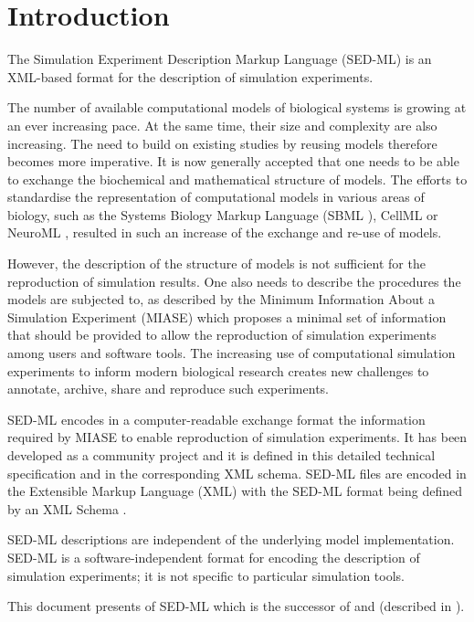 \chapter{Introduction}
The Simulation Experiment Description Markup Language (SED-ML) is an XML-based format for the description of simulation experiments.

The number of available computational models of biological systems is growing at an ever increasing pace. 
At the same time, their size and complexity are also increasing. The need to build on existing studies by reusing models therefore becomes more imperative. It is now generally accepted that one needs to be able to exchange the biochemical and mathematical structure of models. The efforts to standardise the representation of computational models in various areas of biology, such as the Systems Biology Markup Language (SBML \citep{Hucka:2003}), CellML \citep{cuellar:2003} or NeuroML \citep{Goddard:2001}, resulted in such an increase of the exchange and re-use of models. 

However, the description of the structure of models is not sufficient for the reproduction of simulation results. One also needs to describe the procedures the models are subjected to, as described by the Minimum Information About a Simulation Experiment (MIASE) \citep{Waltemath:2011} which proposes a minimal set of information that should be provided to allow the reproduction of simulation experiments among users and software tools. The increasing use of computational simulation experiments to inform modern biological research creates new challenges to annotate, archive, share and reproduce such experiments. 

SED-ML encodes in a computer-readable exchange format the information required by MIASE to enable reproduction of simulation experiments. It has been developed as a community project and it is defined in this detailed technical specification and in the corresponding XML schema. SED-ML files are encoded in the Extensible Markup Language (XML) \citep{Bray:2006} with the SED-ML format being defined by an XML Schema \citep{Fallside:2001}. 

SED-ML descriptions are independent of the underlying model implementation. SED-ML is a software-independent format for encoding the description of simulation experiments; it is not specific to particular simulation tools.

This document presents \currentLV of SED-ML which is the successor of \previousLV and \LoneVone (described in \citep{WAB+11}).

